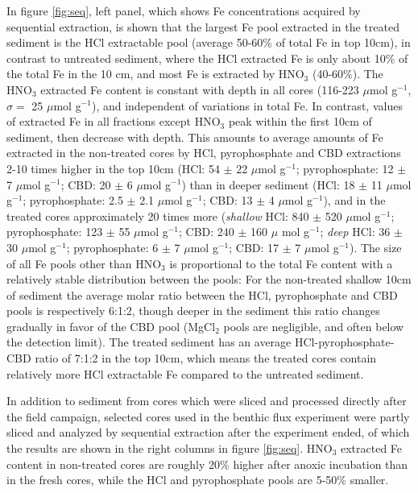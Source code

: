 \documentclass[a4paper,11pt]{article}
\begin{document}
In figure \ref{fig:seq}, left panel, which shows Fe concentrations acquired by sequential extraction, is shown that the largest Fe pool extracted in the treated sediment is the HCl extractable pool (average 50-60\% of total Fe in top 10cm), in contrast to untreated sediment, where the HCl extracted Fe is only about 10\% of the total Fe in the 10 cm, and most Fe is extracted by HNO\(_3\) (40-60\%). The HNO\(_3\) extracted Fe content is constant with depth in all cores (116-223 \(\mu\)mol g\(^{-1}\), \(\sigma=\) 25 \(\mu\)mol g\(^{-1}\)), and independent of variations in total Fe. In contrast, values of extracted Fe in all fractions except HNO\(_3\) peak within the first 10cm of sediment, then decrease with depth. This amounts to average amounts of Fe extracted in the non-treated cores by HCl, pyrophosphate and CBD extractions 2-10 times higher in the top 10cm (HCl: 54 \(\pm\) 22 \(\mu\)mol g\(^{-1}\); pyrophosphate: 12 \(\pm\) 7 \(\mu\)mol g\(^{-1}\); CBD: 20 \(\pm\) 6 \(\mu\)mol g\(^{-1}\)) than in deeper sediment (HCl: 18 \(\pm\) 11 \(\mu\)mol g\(^{-1}\); pyrophosphate: 2.5 \(\pm\) 2.1 \(\mu\)mol g\(^{-1}\); CBD: 13 \(\pm\) 4 \(\mu\)mol g\(^{-1}\)), and in the treated cores approximately 20 times more (\emph{shallow} HCl: 840 \(\pm\) 520 \(\mu\)mol g\(^{-1}\); pyrophosphate: 123 \(\pm\) 55 \(\mu\)mol g\(^{-1}\); CBD: 240 \(\pm\) 160 \(\mu\) mol g\(^{-1}\); \emph{deep} HCl: 36 \(\pm\) 30 \(\mu\)mol g\(^{-1}\); pyrophosphate: 6 \(\pm\) 7 \(\mu\)mol g\(^{-1}\); CBD: 17 \(\pm\) 7 \(\mu\)mol g\(^{-1}\)). The size of all Fe pools other than HNO\(_3\) is proportional to the total Fe content with a relatively stable distribution between the pools: For the non-treated shallow 10cm of sediment the average molar ratio between the HCl, pyrophosphate and CBD pools is respectively 6:1:2, though deeper in the sediment this ratio changes gradually in favor of the CBD pool (MgCl\(_2\) pools are negligible, and often below the detection limit). The treated sediment has an average HCl-pyrophosphate-CBD ratio of 7:1:2 in the top 10cm, which means the treated cores contain relatively more HCl extractable Fe compared to the untreated sediment.

In addition to sediment from cores which were sliced and processed directly after the field campaign, selected cores used in the benthic flux experiment were partly sliced and analyzed by sequential extraction after the experiment ended, of which the results are shown in the right columns in figure \ref{fig:seq}. HNO\(_3\) extracted Fe content in non-treated cores are roughly 20\% higher after anoxic incubation than in the fresh cores, while the HCl and pyrophosphate pools are 5-50\% smaller.
\end{document}
